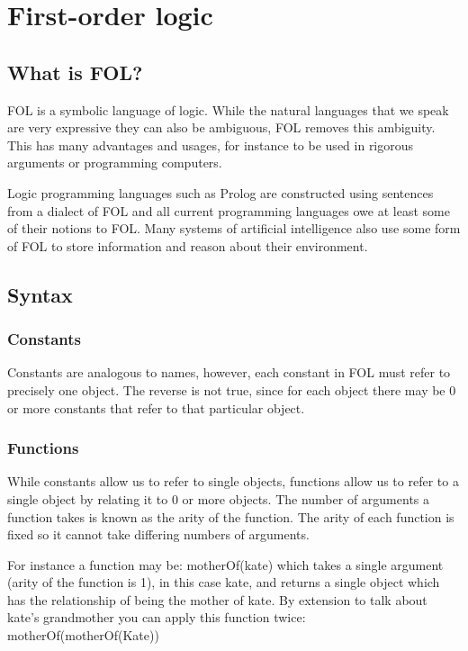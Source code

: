 \section{First-order logic}

\subsection{What is FOL?}

FOL is a symbolic language of logic. While the natural languages that we speak are very expressive they can also be ambiguous, FOL removes this ambiguity. This has many advantages and usages, for instance to be used in rigorous arguments or programming computers. 

Logic programming languages such as Prolog are constructed using sentences from a dialect of FOL and all current programming languages owe at least some of their notions to FOL. \cite[p.~3]{barker2011language} Many systems of artificial intelligence also use some form of FOL to store information and reason about their environment.

\subsection{Syntax}

\subsubsection*{Constants}

Constants are analogous to names, however, each constant in FOL must refer to precisely one object. The reverse is not true, since for each object there may be 0 or more constants that refer to that particular object.

\subsubsection*{Functions}

While constants allow us to refer to single objects, functions allow us to refer to a single object by relating it to 0 or more objects. The number of arguments a function takes is known as the arity of the function. The arity of each function is fixed so it cannot take differing numbers of arguments. 

For instance a function may be: motherOf(kate) which takes a single argument (arity of the function is 1), in this case kate, and returns a single object which has the relationship of being the mother of kate. By extension to talk about kate's grandmother you can apply this function twice: motherOf(motherOf(Kate))

